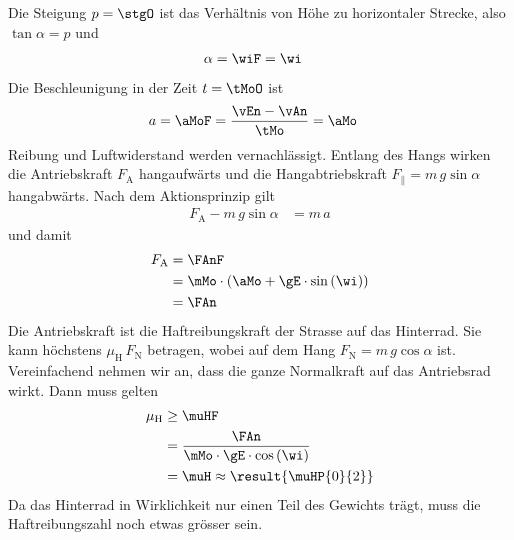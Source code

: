 \begin{center}
\end{center}

Die Steigung $p = \stgO$ ist das Verhältnis von Höhe zu horizontaler Strecke, also $\tan\alpha = p$ und
\begin{align}
 \alpha &= \wiF = \wi
\end{align}
Die Beschleunigung in der Zeit $t = \tMoO$ ist
\begin{align}
 a &= \aMoF = \frac{\vEn-\vAn}{\tMo} = \aMo
\end{align}
Reibung und Luftwiderstand werden vernachlässigt. Entlang des Hangs wirken die Antriebskraft $F_\mathrm{A}$ hangaufwärts und die Hangabtriebskraft $F_\parallel = m\,g\sin\alpha$ hangabwärts. Nach dem Aktionsprinzip gilt
\begin{align}
 F_\mathrm{A} - m\,g\sin\alpha &= m\,a
\end{align}
und damit
\begin{align}
 F_\mathrm{A} &= \FAnF \\
   &= \mMo\cdot\left(\aMo+\gE\cdot\sin\left(\wi\right)\right) \\
   &= \FAn
\end{align}
Die Antriebskraft ist die Haftreibungskraft der Strasse auf das Hinterrad. Sie kann höchstens $\mu_\mathrm{H}\,F_\mathrm{N}$ betragen, wobei auf dem Hang $F_\mathrm{N} = m\,g\cos\alpha$ ist. Vereinfachend nehmen wir an, dass die ganze Normalkraft auf das Antriebsrad wirkt. Dann muss gelten
\begin{align}
 \mu_\mathrm{H} &\geq \muHF \\
   &= \frac{\FAn}{\mMo\cdot\gE\cdot\cos\left(\wi\right)} \\
   &= \muH \approx \result{\muHP{0}{2}}
\end{align}
Da das Hinterrad in Wirklichkeit nur einen Teil des Gewichts trägt, muss die Haftreibungszahl noch etwas grösser sein.
